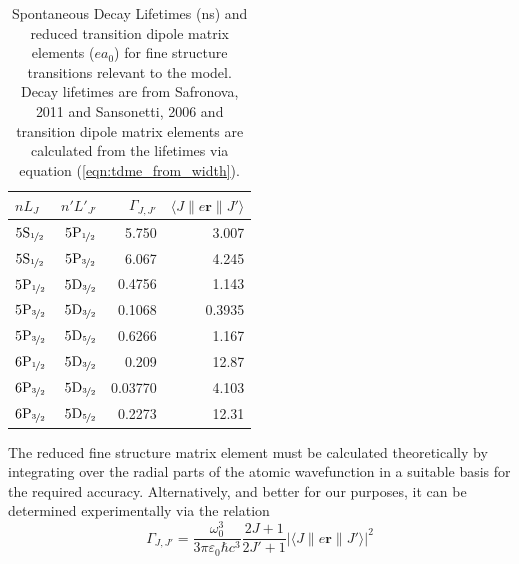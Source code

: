     \begin{table}
      \centering
      \begin{tabular}{ l r r r }
        \hline
        $n L_J$ & $n' L'_{J'}$ & $\Gamma_{J, J'}$ & 
        $\langle J  \| e \mathbf{r} \| J' \rangle$  \\
        \hline      
        $5\rm{S}_{\nicefrac{1}{2}}$ & $5\rm{P}_{\nicefrac{1}{2}}$ 
          & 5.750 & 3.007 \\
        $5\rm{S}_{\nicefrac{1}{2}}$ & $5\rm{P}_{\nicefrac{3}{2}}$ 
          & 6.067 & 4.245 \\
        \noalign{\medskip}
        $5\rm{P}_{\nicefrac{1}{2}}$ & $5\rm{D}_{\nicefrac{3}{2}}$ 
          & 0.4756 & 1.143 \\
        \noalign{\medskip}
        $5\rm{P}_{\nicefrac{3}{2}}$ & $5\rm{D}_{\nicefrac{3}{2}}$ 
          & 0.1068 & 0.3935 \\
        $5\rm{P}_{\nicefrac{3}{2}}$ & $5\rm{D}_{\nicefrac{5}{2}}$ 
          & 0.6266 & 1.167 \\
        \noalign{\medskip}
        $6\rm{P}_{\nicefrac{1}{2}}$ & $5\rm{D}_{\nicefrac{3}{2}}$ 
          & 0.209 & 12.87 \\
        \noalign{\medskip}
        $6\rm{P}_{\nicefrac{3}{2}}$ & $5\rm{D}_{\nicefrac{3}{2}}$ 
          & 0.03770 & 4.103 \\
        $6\rm{P}_{\nicefrac{3}{2}}$ & $5\rm{D}_{\nicefrac{5}{2}}$ 
          & 0.2273 & 12.31 \\
        \hline  
      \end{tabular}
      \caption{
      Spontaneous Decay Lifetimes (ns) and reduced transition dipole matrix
      elements ($e a_0$) for fine structure transitions relevant to the model.
      Decay lifetimes are from Safronova, 2011 and Sansonetti,
      2006\cite{Sansonetti2006,Safronova2011} and transition dipole matrix
      elements are calculated from the lifetimes via equation
      (\ref{eqn:tdme_from_width}).
      }
      \label{tab:exp_widths}
    \end{table}

    The reduced fine structure matrix element must be calculated theoretically
    by integrating over the radial parts of the atomic wavefunction in a
    suitable basis for the required accuracy. Alternatively, and better for our
    purposes, it can be determined experimentally via the
    relation\cite{loudon2000quantum}
    \begin{equation}
      \Gamma_{J, J'} = \frac{\omega_0^3}{3 \pi \varepsilon_0 \hbar c^3} 
        \frac{2J + 1}{2 J' + 1} \left| \langle J  \| e \mathbf{r} \| J' 
        \rangle \right|^2
      \label{eqn:tdme_from_width}
    \end{equation}

